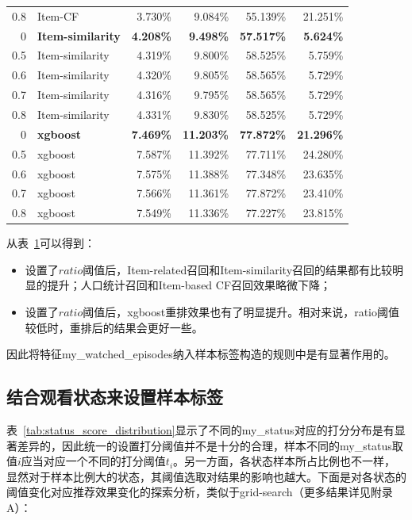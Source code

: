 \begin{table}[htbp]
{\begin{tabular}{rlrrrr}
          0.8  & Item-CF & 3.730\% & 9.084\% & 55.139\% & 21.251\% \\
          0    & \textbf{Item-similarity} & \textbf{4.208\%} & \textbf{9.498\%} & \textbf{57.517\%} & \textbf{5.624\%} \\
          0.5  & Item-similarity & 4.319\% & 9.800\% & 58.525\% & 5.759\% \\
          0.6  & Item-similarity & 4.320\% & 9.805\% & 58.565\% & 5.729\% \\
          0.7  & Item-similarity & 4.316\% & 9.795\% & 58.565\% & 5.729\% \\
          0.8  & Item-similarity & 4.331\% & 9.830\% & 58.525\% & 5.729\% \\
          0    & \textbf{xgboost} & \textbf{7.469\%} & \textbf{11.203\%} & \textbf{77.872\%} & \textbf{21.296\%} \\
          0.5  & xgboost & 7.587\% & 11.392\% & 77.711\% & 24.280\% \\
          0.6  & xgboost & 7.575\% & 11.388\% & 77.348\% & 23.635\% \\
          0.7  & xgboost & 7.566\% & 11.361\% & 77.872\% & 23.410\% \\
          0.8  & xgboost & 7.549\% & 11.336\% & 77.227\% & 23.815\% \\
          \bottomrule
      \end{tabular}}%
      \label{tab:watched_ratio_results}%
    \end{table}%

    从表~\ref{tab:watched_ratio_results}可以得到：
    \begin{itemize}
      \item 设置了$ratio$阈值后，Item-related召回和Item-similarity召回的结果都有比较明显的提升；人口统计召回和Item-based CF召回效果略微下降；
      \item 设置了$ratio$阈值后，xgboost重排效果也有了明显提升。相对来说，ratio阈值较低时，重排后的结果会更好一些。
    \end{itemize}

    因此将特征my\_watched\_episodes纳入样本标签构造的规则中是有显著作用的。

    \subsection{结合观看状态来设置样本标签}
    表~\ref{tab:status_score_distribution}显示了不同的my\_status对应的打分分布是有显著差异的，因此统一的设置打分阈值并不是十分的合理，样本不同的my\_status取值$i$应当对应一个不同的打分阈值$t_i$。另一方面，各状态样本所占比例也不一样，显然对于样本比例大的状态，其阈值选取对结果的影响也越大。下面是对各状态的阈值变化对应推荐效果变化的探索分析，类似于grid-search（更多结果详见附录A）：

